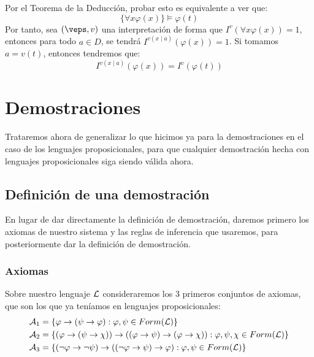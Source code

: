 \begin{ejemplo}
\begin{enumerate}
            Por el Teorema de la Deducción, probar esto es equivalente a ver que:
            \begin{equation*}
                \{\forall x\varphi(x)\}\vDash\varphi(t)
            \end{equation*}
        Por tanto, sea $(\veps, v)$ una interpretación de forma que $I^v(\forall x\varphi(x))=1$, entonces para todo $a\in D$, se tendrá $I^{v(x\mid a)}(\varphi(x)) = 1$. Si tomamos $a=v(t)$, entonces tendremos que:
        \begin{equation*}
            I^{v(x\mid a)}(\varphi(x)) = I^v(\varphi(t))
        \end{equation*}
    \end{enumerate}
\end{ejemplo}

\section{Demostraciones}
Trataremos ahora de generalizar lo que hicimos ya para la demostraciones en el caso de los lenguajes proposicionales, para que cualquier demostración hecha con lenguajes proposicionales siga siendo válida ahora.

\subsection{Definición de una demostración}
En lugar de dar directamente la definición de demostración, daremos primero los axiomas de nuestro sistema y las reglas de inferencia que usaremos, para posteriormente dar la definición de demostración.

\subsubsection{Axiomas}
\noindent
Sobre nuestro lenguaje $\mathcal{L}$ consideraremos los 3 primeros conjuntos de axiomas, que son los que ya teníamos en lenguajes proposicionales:
\begin{align*}
    \mathcal{A}_1 &= \{\varphi\to(\psi\to\varphi) : \varphi,\psi \in Form(\mathcal{L})\} \\
    \mathcal{A}_2 &= \{(\varphi\to(\psi\to\chi))\to((\varphi\to\psi)\to(\varphi\to\chi)) : \varphi,\psi,\chi \in Form(\mathcal{L})\} \\
    \mathcal{A}_3 &= \{(\lnot\varphi\to\lnot\psi)\to((\lnot\varphi\to\psi)\to\varphi) : \varphi,\psi \in Form(\mathcal{L})\}
\end{align*}

